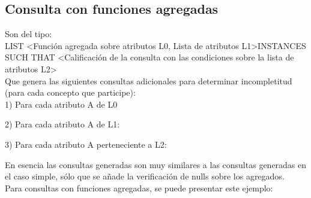 \subsection{Consulta con funciones agregadas}

Son del tipo: \\

LIST \textless Función agregada sobre atributos L0, Lista de atributos L1\textgreater INSTANCES \\
SUCH THAT \textless Calificación de la consulta con las condiciones sobre la lista de atributos L2\textgreater \\

	Que genera las siguientes consultas adicionales para determinar incompletitud (para cada concepto que participe): \\

1) Para cada atributo A de L0 \\


2) Para cada atributo A de L1: \\


3)  Para cada atributo A perteneciente a L2: \\


	En esencia las consultas generadas son muy similares a las consultas generadas en el caso simple, sólo que se añade la  verificación de nulls sobre los agregados. \\

	Para consultas con funciones agregadas, se puede presentar este ejemplo: \\
	


